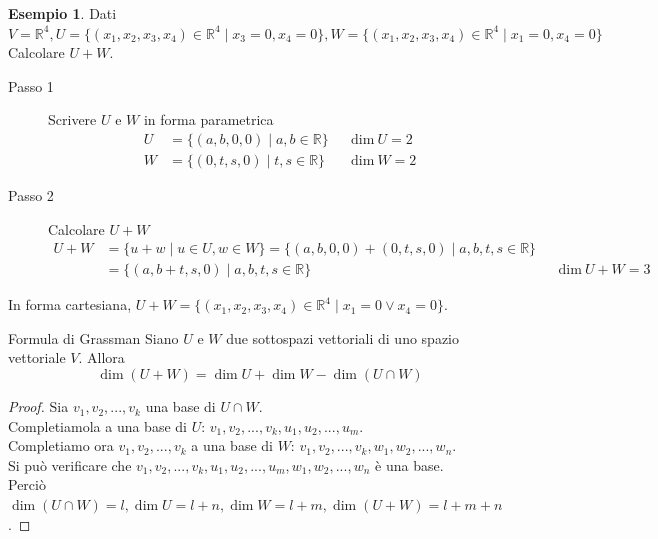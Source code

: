 \documentclass[a4paper]{article}
\theoremstyle{definition}
\newtheorem*{es}{Esempio}
\begin{document}
\begin{es}
	Dati $V = \mathbb{R}^4, U = \{ (x_1, x_2, x_3, x_4) \in \mathbb{R}^4 \mid x_3 = 0, x_4 = 0 \}, W = \{ (x_1, x_2, x_3, x_4) \in \mathbb{R}^4 \mid x_1 = 0, x_4 = 0 \}$ \\
	Calcolare $U + W$.
	\begin{description}
		\item[Passo 1] Scrivere $U$ e $W$ in forma parametrica
		      \begin{align*}
			      U & = \{(a, b, 0, 0) \mid a, b \in \mathbb{R}\} &  & \text{dim} \ U = 2 \\
			      W & = \{(0, t, s, 0) \mid t, s \in \mathbb{R}\} &  & \text{dim} \ W = 2
		      \end{align*}
		\item[Passo 2] Calcolare $U + W$
		      \begin{align*}
			      U + W & = \{u + w \mid u \in U, w \in W\} = \{(a, b, 0, 0) + (0, t, s, 0) \mid a, b, t, s \in \mathbb{R}\}                             \\
			            & = \{(a, b + t, s, 0) \mid a, b, t, s \in \mathbb{R}\}                                              &  & \text{dim} \ U + W = 3
		      \end{align*}
	\end{description}
	In forma cartesiana, $U + W = \{(x_1, x_2, x_3, x_4) \in \mathbb{R}^4 \mid x_1 = 0 \lor x_4 = 0\}$.
\end{es}

\begin{teo}{Formula di Grassman}{}
	Siano $U$ e $W$ due sottospazi vettoriali di uno spazio vettoriale $V$. Allora
	\begin{equation*}
		\dim(U + W) = \dim U + \dim W - \dim(U \cap W)
	\end{equation*}
\end{teo}
\begin{proof}
	Sia $v_1, v_2, ..., v_k$ una base di $U \cap W$. \\
	Completiamola a una base di $U$: $v_1, v_2, ..., v_k, u_1, u_2, ..., u_m$. \\
	Completiamo ora $v_1, v_2, ...,v_k$ a una base di $W$: $v_1, v_2, ..., v_k, w_1, w_2, ..., w_n$. \\
	Si può verificare che $v_1, v_2, ..., v_k, u_1, u_2, ..., u_m, w_1, w_2, ..., w_n$ è una base. \\
	Perciò $\dim(U \cap W) = l, \dim U = l + n, \dim W = l + m, \dim(U + W) = l + m + n$.
\end{proof}
\end{document}
